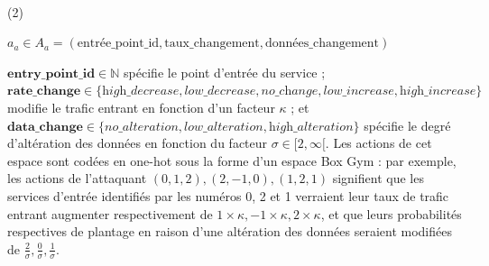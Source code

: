 \

\indent\begin{minipage}{0.06\linewidth}
    (2)
\end{minipage}
\begin{minipage}{0.9\linewidth}
    \raggedright
    $\displaystyle a_a \in A_a = (\text{entrée\_point\_id}, \text{taux\_changement}, \text{données\_changement})$
\end{minipage}

\vspace{0,3cm}

\indent $\mathbf{entry\_point\_id} \in \mathbb{N}$ spécifie le point d'entrée du service ;
$\mathbf{rate\_change} \in \{\textit{high\_decrease}, \textit{low\_decrease}, \textit{no\_change}, \allowbreak \textit{low\_increase}, \allowbreak \textit{high\_increase}\}$ modifie le trafic entrant en fonction d'un facteur $\kappa$ ; et $\mathbf{data\_change} \in \{\textit{no\_alteration}, \allowbreak \textit{low\_alteration}, \allowbreak \textit{high\_alteration}\}$ spécifie le degré d'altération des données en fonction du facteur $\sigma \in [2,\infty[$. Les actions de cet espace sont codées en one-hot sous la forme d'un espace Box Gym : par exemple, les actions de l'attaquant $(0,1,2), (2,-1,0), (1,2,1)$ signifient que les services d'entrée identifiés par les numéros 0, 2 et 1 verraient leur taux de trafic entrant augmenter respectivement de $1 \times \kappa, -1 \times \kappa, 2 \times \kappa$, et que leurs probabilités respectives de plantage en raison d'une altération des données seraient modifiées de $\frac{2}{\sigma}, \frac{0}{\sigma}, \frac{1}{\sigma}$.


